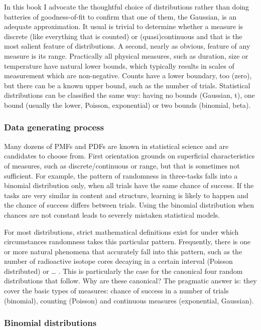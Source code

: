 \documentclass[]{svmono}
\begin{document}
In this book I advocate the thoughtful choice of distributions rather
than doing batteries of goodness-of-fit to confirm that one of them, the
Gaussian, is an adequate approximation. It usual is trivial to determine
whether a measure is discrete (like everything that is counted) or
(quasi)continuous and that is the most salient feature of distributions.
A second, nearly as obvious, feature of any measure is its range.
Practically all physical measures, such as duration, size or temperature
have natural lower bounds, which typically results in scales of
measurement which are non-negative. Counts have a lower boundary, too
(zero), but there can be a known upper bound, such as the number of
trials. Statistical distributions can be classified the same way: having
no bounds (Gaussian, t), one bound (usually the lower, Poisson,
exponential) or two bounds (binomial, beta).

\subsubsection{Data generating process}\label{data-generating-process}

Many dozens of PMFs and PDFs are known in statistical science and are
candidates to choose from. First orientation grounds on superficial
characteristics of measures, such as discrete/continuous or range, but
that is sometimes not sufficient. For example, the pattern of randomness
in three-tasks falls into a binomial distribution only, when all trials
have the same chance of success. If the tasks are very similar in
content and structure, learning is likely to happen and the chance of
success differs between trials. Using the binomial distribution when
chances are not constant leads to severely mistaken statistical models.

For most distributions, strict mathematical definitions exist for under
which circumstances randomness takes this particular pattern.
Frequently, there is one or more natural phenomena that accurately fall
into this pattern, such as the number of radioactive isotope cores
decaying in a certain interval (Poisson distributed) or \ldots{} . This
is particularly the case for the canonical four random distributions
that follow. Why are these canonical? The pragmatic answer is: they
cover the basic types of measures: chance of success in a number of
trials (binomial), counting (Poisson) and continuous measures
(exponential, Gaussian).

\subsubsection{Binomial distributions}\label{binomial_dist}
\end{document}

